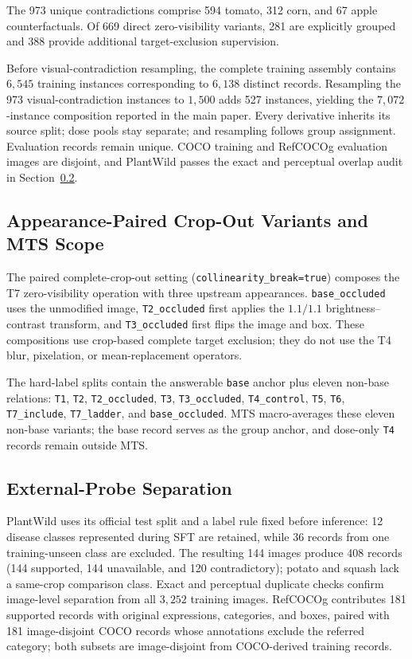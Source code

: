 \documentclass[letterpaper]{article}
\begin{document}
The 973 unique contradictions comprise 594 tomato, 312 corn, and 67 apple
counterfactuals. Of 669 direct zero-visibility variants, 281 are explicitly
grouped and 388 provide additional target-exclusion supervision.

Before visual-contradiction resampling, the complete training assembly contains
$6{,}545$ training instances corresponding to $6{,}138$ distinct records.
Resampling
the 973 visual-contradiction instances to $1{,}500$ adds 527 instances, yielding
the $7{,}072$-instance composition reported in the main paper. Every derivative
inherits its source split; dose pools stay separate; and resampling follows
group assignment. Evaluation records remain unique. COCO training and
RefCOCOg evaluation images are disjoint, and PlantWild passes the exact and
perceptual overlap audit in Section~\ref{sec:external_probe_separation}.

\subsection{Appearance-Paired Crop-Out Variants and MTS Scope}

The paired complete-crop-out setting
(\texttt{collinearity\_break=true}) composes the T7 zero-visibility operation
with three upstream appearances. \texttt{base\_occluded} uses the
unmodified image, \texttt{T2\_occluded} first applies the $1.1/1.1$
brightness--contrast transform, and \texttt{T3\_occluded} first flips the image
and box. These compositions use crop-based complete target exclusion; they do
not use the T4 blur, pixelation, or mean-replacement operators.

The hard-label splits contain the answerable \texttt{base} anchor plus eleven
non-base relations: \texttt{T1}, \texttt{T2}, \texttt{T2\_occluded},
\texttt{T3}, \texttt{T3\_occluded}, \texttt{T4\_control}, \texttt{T5},
\texttt{T6}, \texttt{T7\_include}, \texttt{T7\_ladder}, and
\texttt{base\_occluded}. MTS macro-averages these eleven non-base variants;
the base record serves as the group anchor, and dose-only \texttt{T4} records
remain outside MTS.

\subsection{External-Probe Separation}
\label{sec:external_probe_separation}

PlantWild uses its official test split and a label rule fixed before inference: 12 disease classes represented during SFT are retained, while 36 records from one training-unseen class are excluded. The resulting 144 images produce 408 records (144 supported, 144 unavailable, and 120 contradictory); potato and squash lack a same-crop comparison class. Exact and perceptual duplicate checks confirm image-level separation from all $3{,}252$ training images. RefCOCOg contributes 181 supported records with original expressions, categories, and boxes, paired with 181 image-disjoint COCO records whose annotations exclude the referred category; both subsets are image-disjoint from COCO-derived training records.
\end{document}
